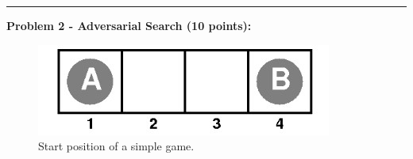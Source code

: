 \documentclass[12pt]{article}
\begin{document}
\pagebreak

\rule{\linewidth}{0.4pt}
\vspace{.2cm}

\textbf{Problem 2 - Adversarial Search (10 points):}

\begin{figure}[h]
    \centering
    \includegraphics{homework1/images/probdescrips/prob2.jpg}
	\caption{Start position of a simple game.}
	\label{fig:prob2}
\end{figure}
\end{document}
